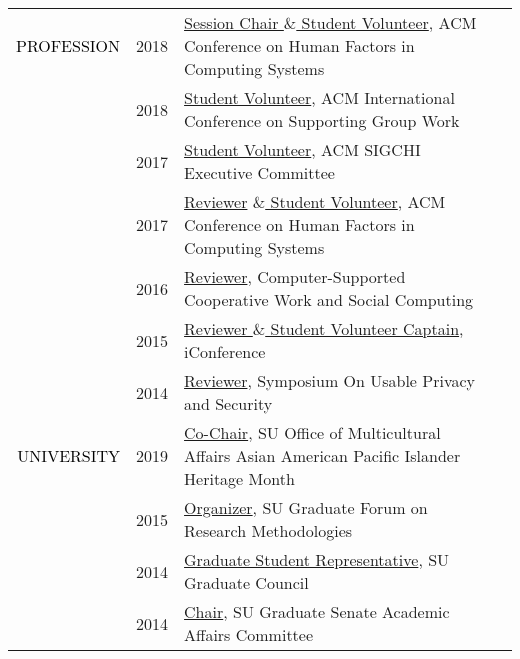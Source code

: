 \documentclass[12pt]{article}
\begin{document}
{{\begin{longtable}{Rp{1.0in}p{0.25in}p{4.75in}}
\textcolor{black}{\footnotesize{\uppercase{Profession}}} & \footnotesize{2018} & \href{https://chi2018.acm.org}{{Session Chair $\&$  Student Volunteer}}, ACM Conference on Human Factors in Computing Systems \\

& \footnotesize{2018} & \href{http://group.acm.org/conferences/group18/index.html}{{Student Volunteer}}, ACM International Conference on Supporting Group Work \\

& \footnotesize{2017} & \href{https://sigchi.org/}{{Student Volunteer}}, ACM SIGCHI Executive Committee \\

& \footnotesize{2017} & \href{https://chi2017.acm.org/}{{Reviewer}} \href{http://ischools.org/the-iconference/}{{$\&$  Student Volunteer}}, ACM Conference on Human Factors in Computing Systems \\

& \footnotesize{2016} & \href{https://cscw.acm.org/}{{Reviewer}}, Computer-Supported Cooperative Work and Social Computing \\

& \footnotesize{2015} & \href{http://ischools.org/the-iconference/}{{Reviewer $\&$  Student Volunteer Captain}}, iConference \\

& \footnotesize{2014} & \href{https://www.usenix.org/sites/default/files/soups14_proceedings.pdf}{{Reviewer}}, Symposium On Usable Privacy and Security \\

\textcolor{black}{\footnotesize{\uppercase{University}}} & \footnotesize{2019} & \href{https://news.syr.edu/blog/2019/03/22/celebrate-asian-american-and-pacific-islander-heritage-month-this-april/}{{Co-Chair}}, SU Office of Multicultural Affairs Asian American Pacific Islander Heritage Month \\

& \footnotesize{2015} & \href{http://gradresearch.syr.edu}{{Organizer}}, SU Graduate Forum on Research Methodologies \\

& \footnotesize{2014} & \href{http://gradorg.syr.edu/senate/committees/}{{Graduate Student Representative}}, SU Graduate Council \\

& \footnotesize{2014} & \href{http://gradorg.syr.edu/senate/committees/}{{Chair}}, SU Graduate Senate Academic Affairs Committee \\


\end{longtable}}}
\end{document}
